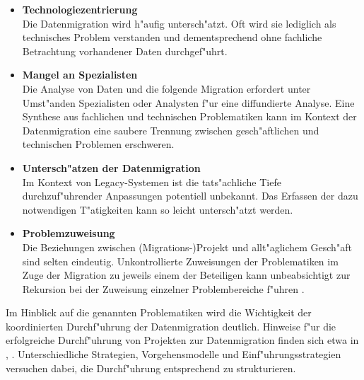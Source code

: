 \begin{itemize}
	\item \textbf{Technologiezentrierung} \\
			Die Datenmigration wird h"aufig untersch"atzt. Oft wird sie lediglich als technisches Problem verstanden \citep[S.~9]{morris-2012} und dementsprechend ohne fachliche Betrachtung vorhandener Daten durchgef"uhrt.
	\item \textbf{Mangel an Spezialisten} \\
			Die Analyse von Daten und die folgende Migration erfordert unter Umst"anden Spezialisten oder Analysten f"ur eine diffundierte Analyse. Eine Synthese aus fachlichen und technischen Problematiken kann im Kontext der Datenmigration eine saubere Trennung zwischen gesch"aftlichen und technischen Problemen erschweren.
	\item \textbf{Untersch"atzen der Datenmigration} \\
			Im Kontext von Legacy-Systemen ist die tats"achliche Tiefe durchzuf"uhrender Anpassungen potentiell unbekannt. Das Erfassen der dazu notwendigen T"atigkeiten kann so leicht untersch"atzt werden.
	\item \textbf{Problemzuweisung} \\
			Die Beziehungen zwischen (Migrations-)Projekt und allt"aglichem Gesch"aft sind selten eindeutig. Unkontrollierte Zuweisungen der Problematiken im Zuge der Migration zu jeweils einem der Beteiligen kann unbeabsichtigt zur Rekursion bei der Zuweisung einzelner Problembereiche f"uhren \citep[S.~9]{morris-2012}.
\end{itemize}

Im Hinblick auf die genannten Problematiken wird die Wichtigkeit der koordinierten Durchf"uhrung der Datenmigration deutlich. Hinweise f"ur die erfolgreiche Durchf"uhrung von Projekten zur Datenmigration finden sich etwa in \citep{sas-2009}, \citep{oracle-2011}. Unterschiedliche Strategien, Vorgehensmodelle und Einf"uhrungsstrategien versuchen dabei, die Durchf"uhrung entsprechend zu strukturieren. 